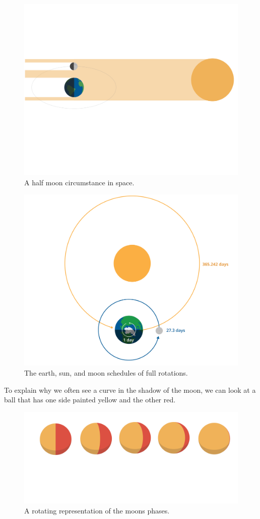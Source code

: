 \begin{figure}[htbp]
    \centering
    \includegraphics[width=.7\textwidth]{moonspace.png}
    \caption{A half moon circumstance in space.}
    \label{fig:moonspace}
\end{figure}
\begin{figure}[htbp]
    \centering
    \includegraphics[width=.7\textwidth]{earthSunMoon.png}
    \caption{The earth, sun, and moon schedules of full rotations.}
    \label{fig:fullrotation}
\end{figure}



To explain why we often see a curve in the shadow of the moon, we can look at a ball that has one side painted yellow and the other red. 
\begin{figure}[htbp]
    \centering
    \includegraphics[width=.5\textwidth]{circleShading.png}
    \caption{A rotating representation of the moons phases.}
    \label{fig:circleShading}
\end{figure}

